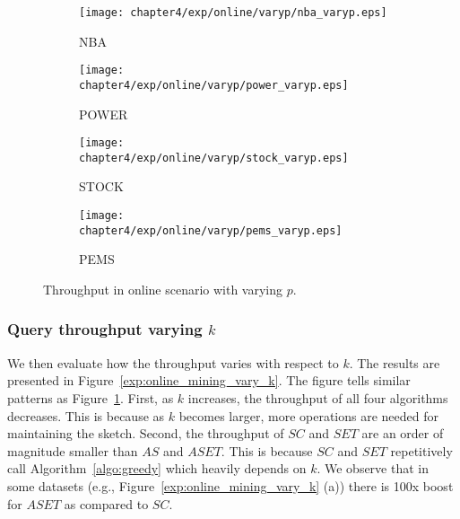 \begin{figure}[t]
\centering
    \begin{subfigure}[b]{0.45\textwidth}
        \texttt{[image: chapter4/exp/online/varyp/nba\_varyp.eps]}
        \caption{NBA}
    \end{subfigure}
    \begin{subfigure}[b]{0.45\textwidth}
        \texttt{[image: chapter4/exp/online/varyp/power\_varyp.eps]}
        \caption{POWER}
    \end{subfigure}
    \begin{subfigure}[b]{0.45\textwidth}
        \texttt{[image: chapter4/exp/online/varyp/stock\_varyp.eps]}
        \caption{STOCK}
    \end{subfigure}
    \begin{subfigure}[b]{0.45\textwidth}
        \texttt{[image: chapter4/exp/online/varyp/pems\_varyp.eps]}
        \caption{PEMS}
    \end{subfigure}
\caption{Throughput in online scenario with varying $p$.}
\label{exp:online_mining_vary_P}
\end{figure}

\subsubsection{Query throughput varying $k$} 
We then evaluate how the throughput varies with respect to $k$. 
The results are presented in Figure~\ref{exp:online_mining_vary_k}.
The figure tells similar patterns as
Figure~\ref{exp:online_mining_vary_P}.
First, as $k$ increases, the throughput of all four algorithms decreases.
This is because as $k$ becomes larger, more operations are needed for maintaining the sketch.
Second, the throughput of $SC$ and $SET$ are an order of magnitude smaller than $AS$ and $ASET$.
This is because $SC$ and $SET$ repetitively call Algorithm~\ref{algo:greedy} which heavily depends 
on $k$.
We observe that in some datasets (e.g., Figure~\ref{exp:online_mining_vary_k} (a)) there is 100x boost for $ASET$ as compared to $SC$.

